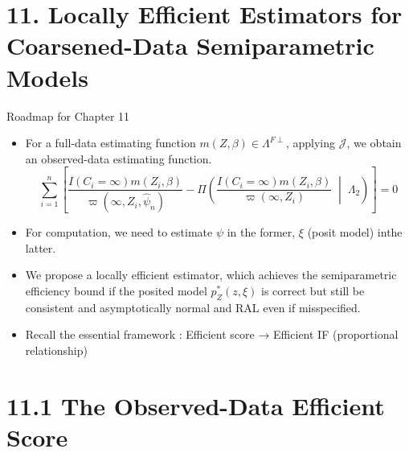 \documentclass[xcolor=dvipsnames,aspectratio=169]{beamer}
\newcommand{\1}{\mathbbm{1}}
\begin{document}
\section{11. Locally Efficient Estimators for Coarsened-Data Semiparametric Models}

\begin{frame}{Roadmap for Chapter 11}
  \begin{itemize}
    \item For a full-data estimating function $m(Z,\beta)\in \Lambda^{F\perp}$, applying $\mathcal{J}$, we obtain an observed-data estimating function.
    \[
    \sum_{i=1}^n \left[
  \frac{ I(C_i = \infty) m(Z_i,\beta) }
       { \varpi(\infty, Z_i, \hat{\psi}_n) }
  - \Pi\!\left(
    \frac{ I(C_i = \infty) m(Z_i,\beta) }
         { \varpi(\infty, Z_i) }
    \;\middle|\; \Lambda_2
  \right)
\right] = 0
    \]
    \item For computation, we need to estimate $\psi$ in the former, $\xi$ (posit model) inthe latter.
    \item We propose a locally efficient estimator, which achieves the semiparametric efficiency bound if the posited model $p_Z^*(z,\xi)$ is correct but still be consistent and asymptotically normal and RAL even if misspecified.
    \item Recall the essential framework : Efficient score → Efficient IF (proportional relationship)
  \end{itemize}
\end{frame}

\section{11.1 The Observed-Data Efficient Score}
\end{document}
